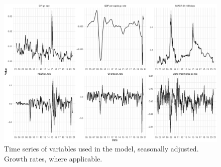 \documentclass[12pt, a4paper]{extarticle}
\begin{document}
\begin{figure}
	\centering
	\includegraphics[width=0.9\linewidth]{figures/time_series}
	\caption[]{Time series of variables used in the model, seasonally adjusted. Growth rates, where applicable.}
	\label{fig:timeseries}
\end{figure}



~\\
\clearpage
\newpage
\pagebreak
\end{document}
